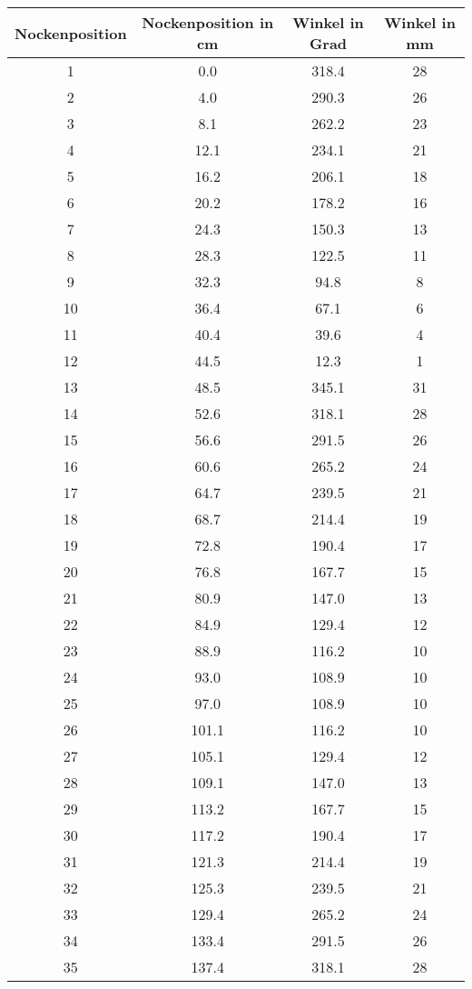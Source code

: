 \documentclass[10pt, a4paper]{article}
\begin{document}
\begin{center}
	\begin{tabular}{c|c|c|c}
		Nockenposition & Nockenposition in cm & Winkel in Grad & Winkel in mm \\
		\hline
		1 & 0.0 & 318.4 & 28 \\
		2 & 4.0 & 290.3 & 26 \\
		3 & 8.1 & 262.2 & 23 \\
		4 & 12.1 & 234.1 & 21 \\
		5 & 16.2 & 206.1 & 18 \\
		6 & 20.2 & 178.2 & 16 \\
		7 & 24.3 & 150.3 & 13 \\
		8 & 28.3 & 122.5 & 11 \\
		9 & 32.3 & 94.8 & 8 \\
		10 & 36.4 & 67.1 & 6 \\
		11 & 40.4 & 39.6 & 4 \\
		12 & 44.5 & 12.3 & 1 \\
		13 & 48.5 & 345.1 & 31 \\
		14 & 52.6 & 318.1 & 28 \\
		15 & 56.6 & 291.5 & 26 \\
		16 & 60.6 & 265.2 & 24 \\
		17 & 64.7 & 239.5 & 21 \\
		18 & 68.7 & 214.4 & 19 \\
		19 & 72.8 & 190.4 & 17 \\
		20 & 76.8 & 167.7 & 15 \\
		21 & 80.9 & 147.0 & 13 \\
		22 & 84.9 & 129.4 & 12 \\
		23 & 88.9 & 116.2 & 10 \\
		24 & 93.0 & 108.9 & 10 \\
		25 & 97.0 & 108.9 & 10 \\
		26 & 101.1 & 116.2 & 10 \\
		27 & 105.1 & 129.4 & 12 \\
		28 & 109.1 & 147.0 & 13 \\
		29 & 113.2 & 167.7 & 15 \\
		30 & 117.2 & 190.4 & 17 \\
		31 & 121.3 & 214.4 & 19 \\
		32 & 125.3 & 239.5 & 21 \\
		33 & 129.4 & 265.2 & 24 \\
		34 & 133.4 & 291.5 & 26 \\
		35 & 137.4 & 318.1 & 28 \\

\end{tabular}
\end{center}
\end{document}
